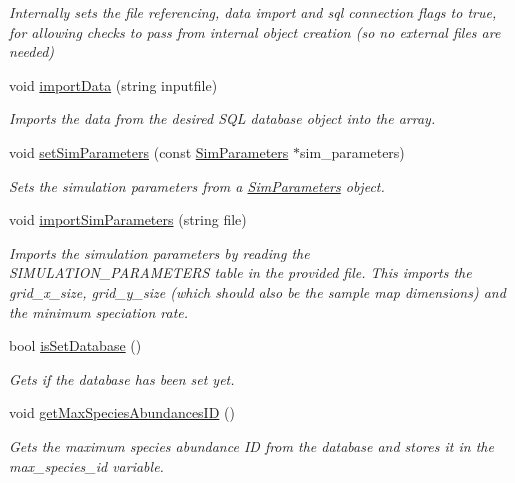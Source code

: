 \begin{DoxyCompactItemize}
\begin{DoxyCompactList}\small\item\em Internally sets the file referencing, data import and sql connection flags to true, for allowing checks to pass from internal object creation (so no external files are needed) \end{DoxyCompactList}\item 
void \hyperlink{class_community_a85db7255d3a1d53509ed2800fc24de31}{import\+Data} (string inputfile)
\begin{DoxyCompactList}\small\item\em Imports the data from the desired S\+QL database object into the array. \end{DoxyCompactList}\item 
void \hyperlink{class_community_a1cbe1518ba094d2f813550fd46a1f464}{set\+Sim\+Parameters} (const \hyperlink{struct_sim_parameters}{Sim\+Parameters} $\ast$sim\+\_\+parameters)
\begin{DoxyCompactList}\small\item\em Sets the simulation parameters from a \hyperlink{struct_sim_parameters}{Sim\+Parameters} object. \end{DoxyCompactList}\item 
void \hyperlink{class_community_a548d36e99e592f0bfc09c8315b27f8bb}{import\+Sim\+Parameters} (string file)
\begin{DoxyCompactList}\small\item\em Imports the simulation parameters by reading the S\+I\+M\+U\+L\+A\+T\+I\+O\+N\+\_\+\+P\+A\+R\+A\+M\+E\+T\+E\+RS table in the provided file. This imports the grid\+\_\+x\+\_\+size, grid\+\_\+y\+\_\+size (which should also be the sample map dimensions) and the minimum speciation rate. \end{DoxyCompactList}\item 
bool \hyperlink{class_community_a88a36fd7a14c3e88af377891e01bba21}{is\+Set\+Database} ()
\begin{DoxyCompactList}\small\item\em Gets if the database has been set yet. \end{DoxyCompactList}\item 
void \hyperlink{class_community_a8ac0ce642595283f342c2f1841f4c20f}{get\+Max\+Species\+Abundances\+ID} ()
\begin{DoxyCompactList}\small\item\em Gets the maximum species abundance ID from the database and stores it in the max\+\_\+species\+\_\+id variable. \end{DoxyCompactList}\item 

\end{DoxyCompactItemize}
